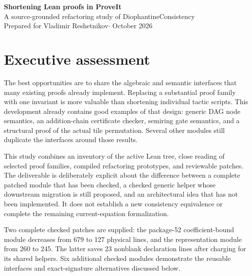 \documentclass[11pt,letterpaper]{article}
\begin{document}
\begin{center}
{\Large\bfseries\color{ink}Shortening Lean proofs in ProveIt}\\[5pt]
{\large A source-grounded refactoring study of DiophantineConsistency}\\[7pt]
Prepared for Vladimir Reshetnikov\quad $\cdot$ October 2026
\end{center}

\section*{Executive assessment}

The best opportunities are to share the algebraic and semantic interfaces that
many existing proofs already implement. Replacing a substantial proof family
with one invariant is more valuable than shortening individual tactic scripts.
This development already contains good examples of that design: generic DAG
node semantics, an addition-chain certificate checker, semiring gate semantics,
and a structural proof of the actual tile permutation. Several other modules
still duplicate the interfaces around those results.

This study combines an inventory of the active Lean tree, close reading of
selected proof families, compiled refactoring prototypes, and reviewable patches.
The deliverable is deliberately explicit about the difference between a complete
patched module that has been checked, a checked generic helper whose downstream
migration is still proposed, and an architectural idea that has not been implemented.
It does not establish a new consistency equivalence or complete the remaining
current-equation formalization.

Two complete checked patches are supplied: the package-52 coefficient-bound
module decreases from 679 to 127 physical lines, and the representation module
from 260 to 245. The latter saves 23 nonblank declaration lines after charging
for its shared helpers. Six additional checked modules demonstrate the reusable
interfaces and exact-signature alternatives discussed below.
\end{document}
